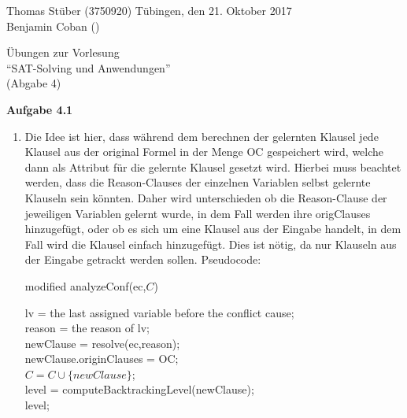 \documentclass[a4paper,10pt]{article}
\title{}
\author{}
\begin{document}
\noindent Thomas Stüber (3750920) \hfill Tübingen, den  21. Oktober 2017\\
\noindent Benjamin Coban () \\
\begin{center}
\Large Übungen zur Vorlesung  \\ ``SAT-Solving und Anwendungen'' \\
\vspace*{2mm}
\large (Abgabe 4) \\
\vspace*{2mm}
\end{center}

\noindent\textbf{Aufgabe 4.1}\\\smallskip
\begin{enumerate}
\item Die Idee ist hier, dass während dem berechnen der gelernten Klausel jede Klausel aus der original Formel in der Menge OC gespeichert wird, welche dann als Attribut für die gelernte Klausel gesetzt wird. Hierbei muss beachtet werden, dass die Reason-Clauses der einzelnen Variablen selbst gelernte Klauseln sein könnten. Daher wird unterschieden ob die Reason-Clause der jeweiligen Variablen gelernt wurde, in dem Fall werden ihre origClauses hinzugefügt, oder ob es sich um eine Klausel aus der Eingabe handelt, in dem Fall wird die Klausel einfach hinzugefügt. Dies ist nötig, da nur Klauseln aus der Eingabe getrackt werden sollen. Pseudocode:
\begin{algorithm}[H]
	\caption{modified analyzeConf(ec,$C$)}
	lv = the last assigned variable before the conflict cause;\\
	reason = the reason of lv;\\
	newClause = resolve(ec,reason);\\
    newClause.originClauses = OC;\\
    $C = C\cup \{newClause\}$;\\
    level = computeBacktrackingLevel(newClause);\\
    \Return level;
\end{algorithm}


\end{enumerate}
\end{document}
